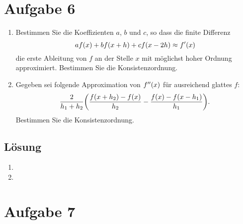 \documentclass{exercise}
\begin{document}
    \section*{Aufgabe 6}

    \begin{problem}
        \begin{enumerate}
            \item Bestimmen Sie die Koeffizienten \(a\), \(b\) und \(c\), so dass die finite Differenz
            \[
                af\parentheses*{x} + bf\parentheses*{x + h} + cf\parentheses*{x - 2h} \approx f'\parentheses*{x}
            \]
            die erste Ableitung von \(f\) an der Stelle \(x\) mit möglichst hoher Ordnung approximiert.
            Bestimmen Sie die Konsistenzordnung.
            \item Gegeben sei folgende Approximation von \(f''\parentheses*{x}\) für ausreichend glattes \(f\):
            \[
                \frac{2}{h_1 + h_2}\parentheses*{\frac{f\parentheses*{x + h_2} - f\parentheses*{x}}{h_2} - \frac{f\parentheses*{x} - f\parentheses*{x - h_1}}{h_1}}.
            \]
            Bestimmen Sie die Konsistenzordnung.
        \end{enumerate}
    \end{problem}

    \subsection*{Lösung}
    \begin{enumerate}
        \item
        \item
    \end{enumerate}


    \section*{Aufgabe 7}
    
\end{document}
